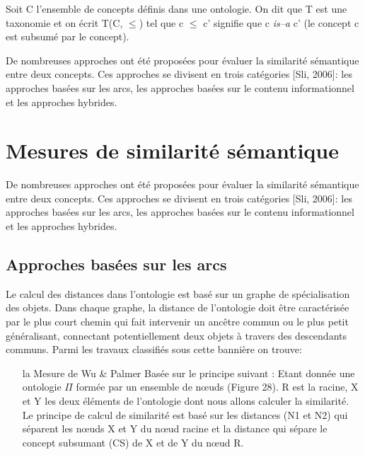\begin{appendices}
\begin{mydef}
  Soit C l'ensemble de concepts définis dans une ontologie. On dit que
  T est une taxonomie et on écrit T(C, $\leq$) tel que c $\leq$ c'
  signifie que c \textit{is–a} c' (le concept c est subsumé par le
  concept).
\end{mydef}

De nombreuses approches ont été proposées pour évaluer la similarité
sémantique entre deux concepts. Ces approches se divisent en trois
catégories [Sli, 2006]: les approches basées sur les arcs, les
approches basées sur le contenu informationnel et les approches
hybrides.

\section{Mesures de similarité sémantique}
\label{sec:semantic-sim}

De nombreuses approches ont été proposées pour évaluer la similarité
sémantique entre deux concepts. Ces approches se divisent en trois
catégories [Sli, 2006]: les approches basées sur les arcs, les
approches basées sur le contenu informationnel et les approches
hybrides.

  \subsection{Approches basées sur les arcs}
  \label{sec:semantic-sim:arcs}

  Le calcul des distances dans l’ontologie est basé sur un graphe de
  spécialisation des objets.  Dans chaque graphe, la distance de
  l’ontologie doit être caractérisée par le plus court chemin qui fait
  intervenir un ancêtre commun ou le plus petit généralisant,
  connectant potentiellement deux objets à travers des descendants
  communs. Parmi les travaux classifiés sous cette bannière on trouve:\\

  \renewcommand{\descriptionlabel}[1]{\hspace{1cm}\textbullet~\textsf{#1}}
  \begin{itemize}
  \item [la Mesure de Wu \& Palmer] Basée sur le principe suivant :
    Etant donnée une ontologie $\Pi$ formée par un ensemble de nœuds
    (Figure 28). R est la racine, X et Y les deux éléments de
    l’ontologie dont nous allons calculer la similarité. Le principe
    de calcul de similarité est basé sur les distances (N1 et N2) qui
    séparent les nœuds X et Y du nœud racine et la distance qui sépare
    le concept subsumant (CS) de X et de Y du nœud R.


\end{itemize}
\end{appendices}
